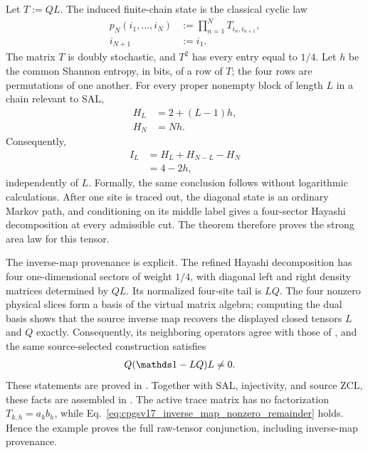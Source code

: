 \documentclass{article}
\begin{document}
Let $T:=QL$. The induced finite-chain state is the classical cyclic law
\begin{align}
    p_N(i_1,\ldots,i_N)
        &:= \prod_{n=1}^N T_{i_n,i_{n+1}},
    \label{eq:cpgsv17_classical_cyclic_law}\\
    i_{N+1}
        &:= i_1.
    \label{eq:cpgsv17_cyclic_boundary_index}
\end{align}
The matrix $T$ is doubly stochastic, and $T^2$ has every entry equal to
$1/4$. Let $h$ be the common Shannon entropy, in bits, of a row of $T$; the
four rows are permutations of one another. For every proper nonempty block of
length $L$ in a chain relevant to SAL,
\begin{align}
    H_L
        &= 2+(L-1)h,
    \label{eq:cpgsv17_block_entropy}\\
    H_N
        &= Nh.
    \label{eq:cpgsv17_chain_entropy}
\end{align}
Consequently,
\begin{align}
    I_L
        &= H_L+H_{N-L}-H_N
    \label{eq:cpgsv17_mutual_information_definition}\\
        &= 4-2h,
    \label{eq:cpgsv17_mutual_information_constant}
\end{align}
independently of $L$. Formally, the same conclusion follows without
logarithmic calculations. After one site is traced out, the diagonal state is
an ordinary Markov path, and conditioning on its middle label gives a
four-sector Hayashi decomposition at every admissible cut. The theorem
 therefore
proves the strong area law for this tensor.

The inverse-map provenance is explicit. The refined Hayashi decomposition has
four one-dimensional sectors of weight $1/4$, with diagonal left and right
density matrices determined by $QL$. Its normalized four-site tail is $LQ$.
The four nonzero physical slices form a basis of the virtual matrix algebra;
computing the dual basis shows that the source inverse map recovers the
displayed closed tensors $L$ and $Q$ exactly. Consequently, its neighboring
operators agree with those of
, and the
same source-selected construction satisfies
\begin{align}
    Q(\Id-LQ)L
        &\neq 0.
    \label{eq:cpgsv17_inverse_map_nonzero_remainder}
\end{align}
These statements are proved in
. Together with SAL,
injectivity, and source ZCL, these facts are assembled in
. The active trace
matrix has no factorization $T_{k,h}=a_kb_h$, while
Eq.~\ref{eq:cpgsv17_inverse_map_nonzero_remainder} holds. Hence the example
proves the full raw-tensor conjunction, including inverse-map provenance.
\end{document}
